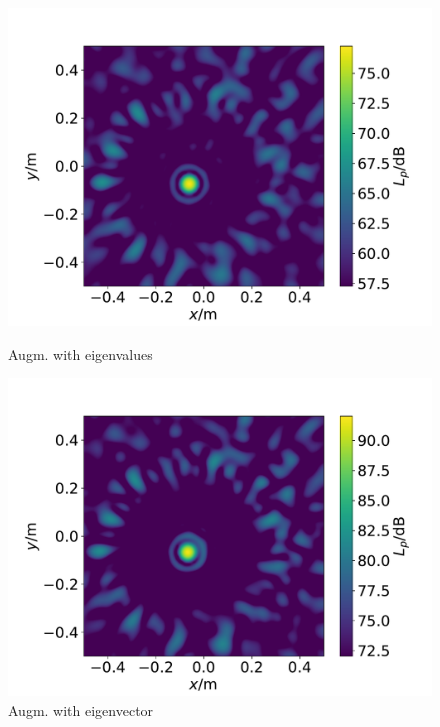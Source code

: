 \documentclass[12pt,pdftex,16x10]{elpres} %
\begin{document}
\begin{psli}
\begin{figure}
    \begin{minipage}[b]{0.4\linewidth}
      \centering
      \includegraphics[width=\textwidth]{figs/data_augmentation_evals_augmented_csm.pdf}
      \caption{Augm. with eigenvalues}
    \end{minipage}
    \begin{minipage}[b]{0.4\linewidth}
      \centering
      \includegraphics[width=\textwidth]{figs/data_augmentation_evecs_augmented_csm.pdf}
      \caption{Augm. with eigenvector}
    \end{minipage}
  \end{figure}
\end{psli}
\end{document}
